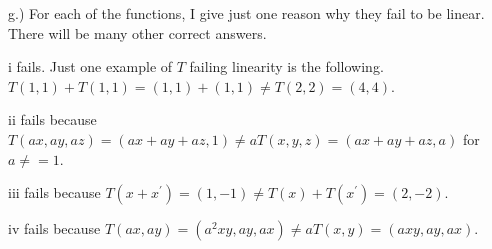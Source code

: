 \documentclass{article}
\begin{document}
g.) For each of the functions, I give just one reason why they fail to be linear. There will be many other correct answers. 

i fails. Just one example of $T$ failing linearity is the following. $T(1,1)+T(1,1)=(1,1)+(1,1)\neq T(2,2)=(4,4)$. 

ii fails because $T(ax,ay,az)=(ax+ay+az,1)\neq aT(x,y,z)=(ax+ay+az,a)$ for $a\neq=1$.


iii fails because $T(x+x^\prime)=(1,-1)\neq T(x)+T(x^\prime)=(2,-2)$.


iv fails because $T(ax,ay)=(a^2xy,ay,ax)\neq aT(x,y)=(axy,ay,ax)$.
\end{document}
